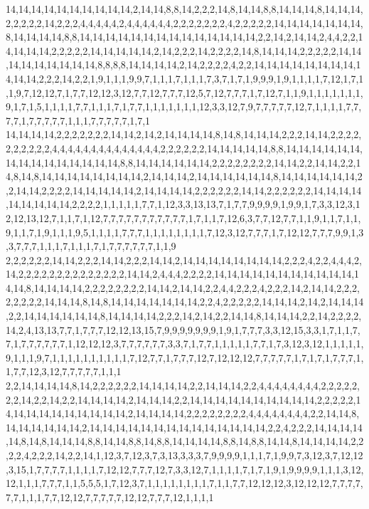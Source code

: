 14,14,14,14,14,14,14,14,14,14,2,14,14,8,8,14,2,2,2,14,8,14,14,8,8,14,14,14,8,14,14,14,2,2,2,2,2,14,2,2,2,4,4,4,4,4,2,4,4,4,4,4,4,2,2,2,2,2,2,2,4,2,2,2,2,2,14,14,14,14,14,14,14,8,14,14,14,14,8,8,14,14,14,14,14,14,14,14,14,14,14,14,14,14,2,2,14,2,14,14,2,4,4,2,2,14,14,14,14,2,2,2,2,2,14,14,14,14,14,2,14,2,2,2,14,2,2,2,2,14,8,14,14,14,2,2,2,2,2,14,14,14,14,14,14,14,14,14,8,8,8,8,14,14,14,14,2,14,2,2,2,2,4,2,2,14,14,14,14,14,14,14,14,14,14,14,2,2,2,14,2,2,1,9,1,1,1,9,9,7,1,1,1,7,1,1,1,7,3,7,1,7,1,9,9,9,1,9,1,1,1,1,7,12,1,7,1,1,9,7,12,12,7,1,7,7,12,12,3,12,7,7,12,7,7,7,12,5,7,12,7,7,7,1,7,12,7,1,1,9,1,1,1,1,1,1,1,9,1,7,1,5,1,1,1,1,7,7,1,1,1,7,1,7,7,1,1,1,1,1,1,1,12,3,3,12,7,9,7,7,7,7,7,12,7,1,1,1,1,7,7,7,7,1,7,7,7,7,7,1,1,1,7,7,7,7,7,1,7,1
14,14,14,14,2,2,2,2,2,2,2,14,14,2,14,2,14,14,14,14,8,14,8,14,14,14,2,2,2,14,14,2,2,2,2,2,2,2,2,2,2,4,4,4,4,4,4,4,4,4,4,4,4,4,4,2,2,2,2,2,2,14,14,14,14,14,8,8,14,14,14,14,14,14,14,14,14,14,14,14,14,14,14,8,8,14,14,14,14,14,14,2,2,2,2,2,2,2,2,14,14,2,2,14,14,2,2,14,8,14,8,14,14,14,14,14,14,14,14,2,14,14,14,2,14,14,14,14,14,14,8,14,14,14,14,14,14,2,2,14,14,2,2,2,2,14,14,14,14,14,2,14,14,14,14,2,2,2,2,2,2,14,14,2,2,2,2,2,2,14,14,14,14,14,14,14,14,14,2,2,2,2,1,1,1,1,1,7,7,1,12,3,3,13,13,7,1,7,7,9,9,9,9,1,9,9,1,7,3,3,12,3,12,12,13,12,7,1,1,7,1,12,7,7,7,7,7,7,7,7,7,7,7,1,7,1,1,7,12,6,3,7,7,12,7,7,1,1,9,1,1,7,1,1,9,1,1,7,1,9,1,1,1,9,5,1,1,1,1,7,7,7,1,1,1,1,1,1,1,1,7,12,3,12,7,7,7,1,7,12,12,7,7,7,9,9,1,3,3,7,7,7,1,1,1,7,1,1,1,7,1,7,7,7,7,7,7,1,1,9
2,2,2,2,2,2,14,14,2,2,2,14,14,2,2,2,14,14,2,14,14,14,14,14,14,14,14,2,2,2,4,2,2,4,4,4,2,14,2,2,2,2,2,2,2,2,2,2,2,2,2,2,14,14,2,4,4,4,2,2,2,2,14,14,14,14,14,14,14,14,14,14,14,14,14,8,14,14,14,14,2,2,2,2,2,2,2,2,14,14,2,14,14,2,2,4,4,2,2,2,4,2,2,2,14,2,14,14,2,2,2,2,2,2,2,2,14,14,14,8,14,8,14,14,14,14,14,14,14,2,2,4,2,2,2,2,2,14,14,14,2,14,2,14,14,14,2,2,14,14,14,14,14,14,8,14,14,14,14,2,2,2,14,2,14,2,2,14,14,8,14,14,14,2,2,14,2,2,2,2,14,2,4,13,13,7,7,1,7,7,7,12,12,13,15,7,9,9,9,9,9,9,9,1,9,1,7,7,7,3,3,12,15,3,3,1,7,1,1,7,7,1,7,7,7,7,7,7,1,12,12,12,3,7,7,7,7,7,7,3,3,7,1,7,7,1,1,1,1,1,7,7,1,7,3,12,3,12,1,1,1,1,1,9,1,1,1,9,7,1,1,1,1,1,1,1,1,1,1,7,12,7,7,1,7,7,7,12,7,12,12,12,7,7,7,7,7,1,7,1,7,1,7,7,7,1,1,7,7,12,3,12,7,7,7,7,7,1,1,1
2,2,14,14,14,14,8,14,2,2,2,2,2,2,14,14,14,14,2,2,14,14,14,2,2,4,4,4,4,4,4,4,4,2,2,2,2,2,2,2,14,2,2,14,2,2,14,14,14,14,2,14,14,14,2,2,14,14,14,14,14,14,14,14,14,14,2,2,2,2,2,14,14,14,14,14,14,14,14,14,14,2,14,14,14,14,2,2,2,2,2,2,2,2,4,4,4,4,4,4,4,4,2,2,14,14,8,14,14,14,14,14,14,2,14,14,14,14,14,14,14,14,14,14,14,14,14,14,2,2,4,2,2,2,14,14,14,14,14,8,14,8,14,14,14,8,8,14,14,8,8,14,8,8,14,14,14,14,8,8,14,8,8,14,14,8,14,14,14,14,2,2,2,2,4,2,2,2,14,2,2,14,1,12,3,7,12,3,7,3,13,3,3,3,7,9,9,9,9,1,1,1,7,1,9,9,7,3,12,3,7,12,12,3,15,1,7,7,7,7,1,1,1,1,7,12,12,7,7,7,12,7,3,3,12,7,1,1,1,1,7,1,7,1,9,1,9,9,9,9,1,1,1,3,12,12,1,1,1,7,7,7,1,1,5,5,5,1,7,12,3,7,1,1,1,1,1,1,1,1,7,1,1,7,7,12,12,12,3,12,12,12,7,7,7,7,7,7,1,1,1,7,7,12,12,7,7,7,7,7,12,12,7,7,7,12,1,1,1,1
